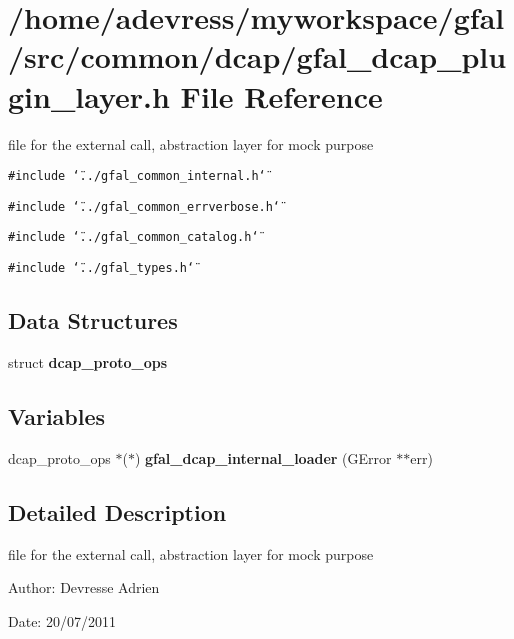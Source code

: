 \section{/home/adevress/myworkspace/gfal/src/common/dcap/gfal\_\-dcap\_\-plugin\_\-layer.h File Reference}
\label{gfal__dcap__plugin__layer_8h}
file for the external call, abstraction layer for mock purpose 

{\tt \#include \char`\"{}../gfal\_\-common\_\-internal.h\char`\"{}}\par
{\tt \#include \char`\"{}../gfal\_\-common\_\-errverbose.h\char`\"{}}\par
{\tt \#include \char`\"{}../gfal\_\-common\_\-catalog.h\char`\"{}}\par
{\tt \#include \char`\"{}../gfal\_\-types.h\char`\"{}}\par
\subsection*{Data Structures}
\begin{CompactItemize}
\item 
struct \textbf{dcap\_\-proto\_\-ops}
\end{CompactItemize}
\subsection*{Variables}
\begin{CompactItemize}
\item 
dcap\_\-proto\_\-ops $\ast$($\ast$) \textbf{gfal\_\-dcap\_\-internal\_\-loader} (GError $\ast$$\ast$err)\label{gfal__dcap__plugin__layer_8h_613ae4b8bc8b68f6578a1451f436cc4f}

\end{CompactItemize}


\subsection{Detailed Description}
file for the external call, abstraction layer for mock purpose 

\begin{Desc}
\item[Author:]Devresse Adrien \end{Desc}
\begin{Desc}
\item[Date:]20/07/2011 \end{Desc}
